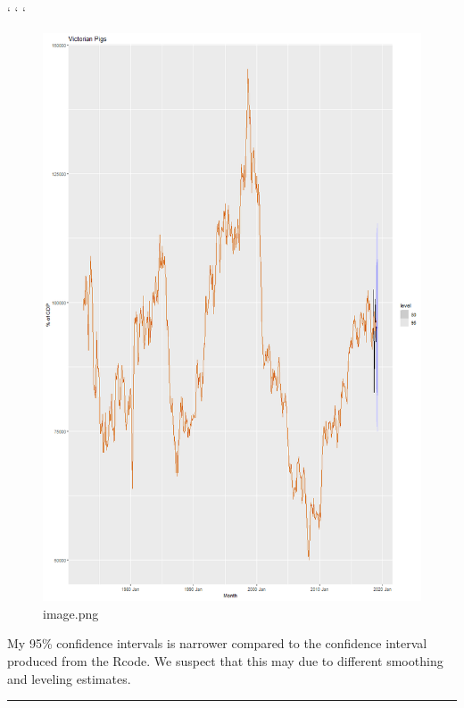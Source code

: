 \documentclass[
  11pt,
]{article}
\begin{document}
` ` `

\begin{figure}[H]

{\centering \includegraphics{hw5_files/figure-pdf/cell-20-1-image.png}

}

\caption{image.png}

\end{figure}%

My 95\% confidence intervals is narrower compared to the confidence
interval produced from the Rcode. We suspect that this may due to
different smoothing and leveling estimates.

\begin{center}\rule{0.5\linewidth}{0.5pt}\end{center}
\end{document}
